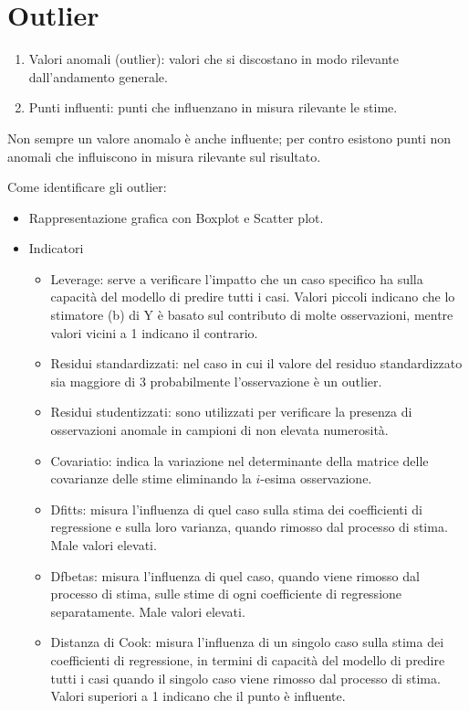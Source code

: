\documentclass[a4page, 11pt]{article} %
\begin{document}
\section{Outlier}

\begin{enumerate}[noitemsep]
\item Valori anomali (outlier): valori che si discostano in modo rilevante dall’andamento generale.
\item Punti influenti: punti che influenzano in misura rilevante le stime.
\end{enumerate}
Non sempre un valore anomalo è anche influente; per contro esistono punti non anomali che influiscono in misura rilevante sul risultato.

Come identificare gli outlier:
\begin{itemize}[noitemsep]
\item Rappresentazione grafica con Boxplot e Scatter plot.
\item Indicatori
	\begin{itemize}[noitemsep]
	\item Leverage: serve a verificare l’impatto che un caso specifico ha sulla capacità del modello di predire tutti i casi. Valori piccoli indicano che lo stimatore (b) di Y è basato sul contributo di molte osservazioni, mentre valori vicini a 1 indicano il contrario.
	\item Residui standardizzati: nel caso in cui il valore del residuo standardizzato sia maggiore di 3 probabilmente l’osservazione è un outlier.
	\item Residui studentizzati: sono utilizzati per verificare la presenza di osservazioni anomale in campioni di non elevata numerosità.
	\item Covariatio: indica la variazione nel determinante della matrice delle covarianze delle stime eliminando la $i$-esima osservazione.
	\item Dfitts: misura l’influenza di quel caso sulla stima dei coefficienti di regressione e sulla loro varianza, quando rimosso dal processo di stima. Male valori elevati.
	\item Dfbetas: misura l’influenza di quel caso, quando viene rimosso dal processo di stima, sulle stime di ogni coefficiente di regressione separatamente. Male valori elevati.
	\item Distanza di Cook: misura l’influenza di un singolo caso sulla stima dei coefficienti di regressione, in termini di capacità del modello di predire tutti i casi quando il singolo caso viene rimosso dal processo di stima. Valori superiori a 1 indicano che il punto è influente.
	\end{itemize}
\end{itemize}
\end{document}
